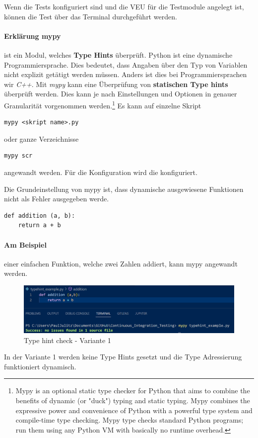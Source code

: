 Wenn die Tests konfiguriert sind und die \gls{VEU} für die Testmodule angelegt ist, können die Test über das Terminal durchgeführt werden.

\paragraph{Erklärung mypy} ist ein Modul, welches \textbf{Type Hints} überprüft.
Python ist eine dynamische Programmiersprache. Dies bedeutet, dass Angaben über den Typ von Variablen nicht explizit getätigt werden müssen. Anders ist dies bei Programmiersprachen wir \textit{C++}. Mit \textit{mypy} kann eine Überprüfung von \textbf{statischen Type hints} überprüft werden. Dies kann je nach Einstellungen und Optionen in genauer Granularität vorgenommen werden.\footnote{
Mypy is an optional static type checker for Python that aims to combine the benefits of dynamic (or "duck") typing and static typing. Mypy combines the expressive power and convenience of Python with a powerful type system and compile-time type checking. Mypy type checks standard Python programs; run them using any Python VM with basically no runtime overhead.
} 
Es kann auf einzelne Skript

\begin{lstlisting}[style=CMD]
mypy <skript name>.py
\end{lstlisting}

oder ganze Verzeichnisse
\begin{lstlisting}[style=CMD]
	mypy scr
\end{lstlisting}
angewandt werden. Für die Konfiguration wird die  konfiguriert.

Die Grundeinstellung von mypy ist, dass dynamische ausgewiesene Funktionen nicht als Fehler ausgegeben werde.

\begin{lstlisting}[style=python, caption={Example dynamical typed function}, captionpos=b]
def addition (a, b):
	return a + b
\end{lstlisting} 

\paragraph{Am Beispiel} einer einfachen Funktion, welche zwei Zahlen addiert, kann mypy angewandt werden.
\begin{figure}[H]
	\centering
	\includegraphics[scale = 0.6]{attachment/chapter_2/Scc078}
	\caption{Type hint check - Variante 1}
\end{figure}
In der Variante 1 werden keine Type Hints gesetzt und die Type Adressierung funktioniert dynamisch.

